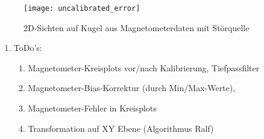 \begin{figure}[ht]
\centering

    \texttt{[image: uncalibrated\_error]}
    \label{fig:uncalibrated_error}

\caption[]{2D-Sichten auf Kugel aus Magnetometerdaten mit Störquelle}
\label{fig:uncalibrated_error}
\end{figure}


\begin{enumerate}
\item ToDo's:
\begin{enumerate}
\item Magnetometer-Kreisplots vor/nach Kalibrierung, Tiefpassfilter
\item Magnetometer-Bias-Korrektur (durch Min/Max-Werte), 
\item Magnetometer-Fehler in Kreisplots
\item Transformation auf XY Ebene (Algorithmus Ralf)
\end{enumerate}
\end{enumerate}